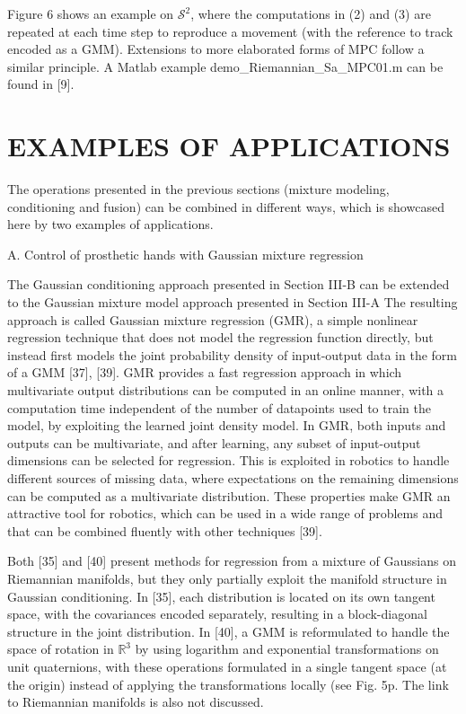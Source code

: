\documentclass[10pt]{article}
\begin{document}
Figure 6 shows an example on $\mathcal{S}^{2}$, where the computations in (2) and (3) are repeated at each time step to reproduce a movement (with the reference to track encoded as a GMM). Extensions to more elaborated forms of MPC follow a similar principle. A Matlab example demo\_Riemannian\_Sa\_MPC01.m can be found in [9].

\section{EXAMPLES OF APPLICATIONS}
The operations presented in the previous sections (mixture modeling, conditioning and fusion) can be combined in different ways, which is showcased here by two examples of applications.

A. Control of prosthetic hands with Gaussian mixture regression

The Gaussian conditioning approach presented in Section III-B can be extended to the Gaussian mixture model approach presented in Section III-A The resulting approach is called Gaussian mixture regression (GMR), a simple nonlinear regression technique that does not model the regression function directly, but instead first models the joint probability density of input-output data in the form of a GMM [37], [39]. GMR provides a fast regression approach in which multivariate output distributions can be computed in an online manner, with a computation time independent of the number of datapoints used to train the model, by exploiting the learned joint density model. In GMR, both inputs and outputs can be multivariate, and after learning, any subset of input-output dimensions can be selected for regression. This is exploited in robotics to handle different sources of missing data, where expectations on the remaining dimensions can be computed as a multivariate distribution. These properties make GMR an attractive tool for robotics, which can be used in a wide range of problems and that can be combined fluently with other techniques [39].

Both [35] and [40] present methods for regression from a mixture of Gaussians on Riemannian manifolds, but they only partially exploit the manifold structure in Gaussian conditioning. In [35], each distribution is located on its own tangent space, with the covariances encoded separately, resulting in a block-diagonal structure in the joint distribution. In [40], a GMM is reformulated to handle the space of rotation in $\mathbb{R}^{3}$ by using logarithm and exponential transformations on unit quaternions, with these operations formulated in a single tangent space (at the origin) instead of applying the transformations locally (see Fig. 5p. The link to Riemannian manifolds is also not discussed.
\end{document}
